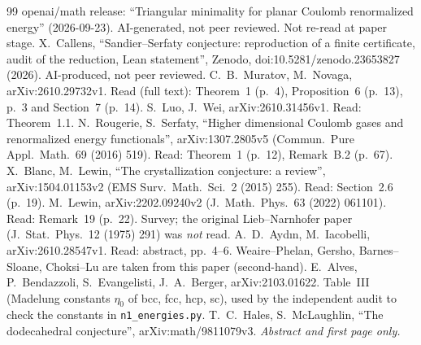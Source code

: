 \documentclass[10pt]{article}
\theoremstyle{remark}
\begin{document}
\begin{thebibliography}{99}\small
{} openai/math release: ``Triangular minimality for planar Coulomb renormalized energy'' (2026-09-23). AI-generated, not peer reviewed. Not re-read at paper stage.
 X.~Callens, ``Sandier--Serfaty conjecture: reproduction of a finite certificate, audit of the reduction, Lean statement'', Zenodo, doi:10.5281/zenodo.23653827 (2026). AI-produced, not peer reviewed.
 C.~B.~Muratov, M.~Novaga, arXiv:2610.29732v1. Read (full text): Theorem~1 (p.~4), Proposition~6 (p.~13), p.~3 and Section~7 (p.~14).
 S.~Luo, J.~Wei, arXiv:2610.31456v1. Read: Theorem~1.1.
 N.~Rougerie, S.~Serfaty, ``Higher dimensional Coulomb gases and renormalized energy functionals'', arXiv:1307.2805v5 (Commun.\ Pure Appl.\ Math.\ 69 (2016) 519). Read: Theorem~1 (p.~12), Remark~B.2 (p.~67).
 X.~Blanc, M.~Lewin, ``The crystallization conjecture: a review'', arXiv:1504.01153v2 (EMS Surv.\ Math.\ Sci.\ 2 (2015) 255). Read: Section~2.6 (p.~19).
 M.~Lewin, arXiv:2202.09240v2 (J.\ Math.\ Phys.\ 63 (2022) 061101). Read: Remark~19 (p.~22). Survey; the original Lieb--Narnhofer paper (J.\ Stat.\ Phys.\ 12 (1975) 291) was \emph{not} read.
 A.~D.~Ayd{\i}n, M.~Iacobelli, arXiv:2610.28547v1. Read: abstract, pp.~4--6. Weaire--Phelan, Gersho, Barnes--Sloane, Choksi--Lu are taken from this paper (second-hand).
 E.~Alves, P.~Bendazzoli, S.~Evangelisti, J.~A.~Berger, arXiv:2103.01622. Table~III (Madelung constants $\eta_0$ of bcc, fcc, hcp, sc), used by the independent audit to check the constants in \texttt{n1\_energies.py}.
 T.~C.~Hales, S.~McLaughlin, ``The dodecahedral conjecture'', arXiv:math/9811079v3. \emph{Abstract and first page only.}
\end{thebibliography}
\end{document}
